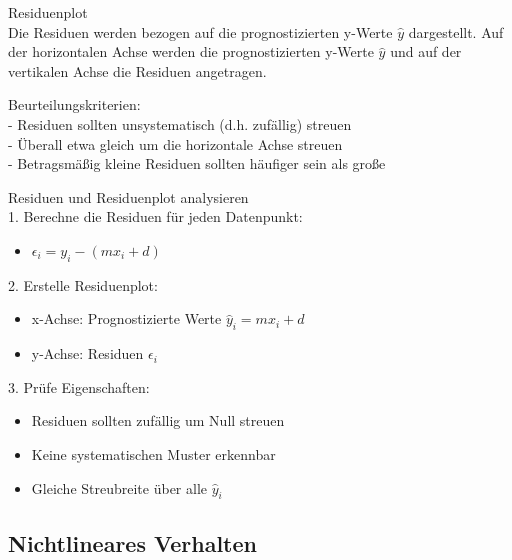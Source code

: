 \begin{concept}{Residuenplot}\\
Die Residuen werden bezogen auf die prognostizierten y-Werte $\hat{y}$ dargestellt. Auf der horizontalen Achse werden die prognostizierten y-Werte $\hat{y}$ und auf der vertikalen Achse die Residuen angetragen.

Beurteilungskriterien:\\
- Residuen sollten unsystematisch (d.h. zufällig) streuen\\
- Überall etwa gleich um die horizontale Achse streuen\\
- Betragsmäßig kleine Residuen sollten häufiger sein als große
\end{concept}

\begin{KR}{Residuen und Residuenplot analysieren}\\
1. Berechne die Residuen für jeden Datenpunkt:
   \begin{itemize}
     \item $\epsilon_i = y_i - (mx_i + d)$
   \end{itemize}
2. Erstelle Residuenplot:
   \begin{itemize}
     \item x-Achse: Prognostizierte Werte $\hat{y}_i = mx_i + d$
     \item y-Achse: Residuen $\epsilon_i$
   \end{itemize}
3. Prüfe Eigenschaften:
   \begin{itemize}
     \item Residuen sollten zufällig um Null streuen
     \item Keine systematischen Muster erkennbar
     \item Gleiche Streubreite über alle $\hat{y}_i$
   \end{itemize}
\end{KR}

\subsection{Nichtlineares Verhalten}


